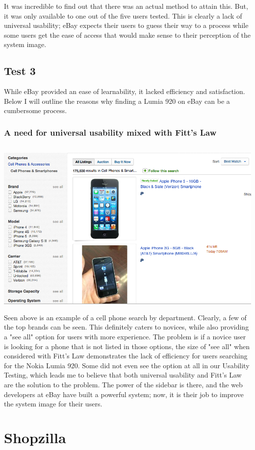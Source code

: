 \documentclass[11pt, oneside]{article}   	%
\begin{document}
It was incredible to find out that there was an actual method to attain this. But, it was only available to one out of the five users tested. This is clearly a lack of universal usability; eBay expects their users to guess their way to a process while some users get the ease of access that would make sense to their perception of the system image.
\subsection{Test 3}
While eBay provided an ease of learnability, it lacked efficiency and satisfaction. Below I will outline the reasons why finding a Lumia 920 on eBay can be a cumbersome process.
\subsubsection{A need for universal usability mixed with Fitt's Law}
\includegraphics[width=6in, height=3.5in]{eBay5}
Seen above is an example of a cell phone search by department. Clearly, a few of the top brands can be seen. This definitely caters to novices, while also providing a "see all" option for users with more experience. The problem is if a novice user is looking for a phone that is not listed in those options, the size of "see all" when considered with Fitt's Law demonstrates the lack of efficiency for users searching for the Nokia Lumia 920. Some did not even see the option at all in our Usability Testing, which leads me to believe that both universal usability and Fitt's Law are the solution to the problem. The power of the sidebar is there, and the web developers at eBay have built a powerful system; now, it is their job to improve the system image for their users.
\section{Shopzilla}
\end{document}
